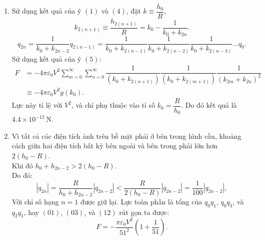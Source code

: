\begin{loigiai}
\begin{enumerate}
\begin{enumerate}[1) ]
        \item Sử dụng kết quả của ý $(1)$ và $(4)$, đặt $k\equiv\dfrac{h_0}{R}$,
        \[k_{2(n+1)}\equiv\dfrac{h_{2(n+1)}}{R}=k_0-\dfrac{1}{k_0+k_{2n}}.\]
        \[q_{2n}=\dfrac{1}{k_0+k_{2n-2}}q_{2(n-1)}=\dfrac{1}{k_0+k_{2(n-1)}}\dfrac{1}{k_0+k_{2(n-2)}}\dfrac{1}{k_0+k_{2(n-3)}}\dots q_0.\]
        Sử dụng kết quả của ý $(5)$:
        \begin{align*}
              F&=-4\pi\varepsilon_0V^2\sum_{m=0}^{\infty}\sum_{n=0}^{\infty}\dfrac{1}{(k_0+k_{2(n+1)})}\dfrac{1}{(k_0+k_{2(m+1)})}\dfrac{1}{(k_{2m}+k_{2n})^2}\\
              &\equiv-4\pi\varepsilon_0V^2g(k_0). 
        \end{align*}
      Lực này tỉ lệ với $V^2$, và chỉ phụ thuộc vào tỉ số $k_0=\dfrac{R}{h_0}$. Do đó kết quả là $4.4\times10^{-12}~\mathrm{N}$.
        \item Vì tất cả các điện tích ảnh trên bề mặt phải ở bên trong hình cầu, khoảng cách giữa hai điện tích bất kỳ bên ngoài và bên trong phải lớn hơn $2(h_0-R)$.\\
        Khi đó $h_0+h_{2n-2}>2(h_0-R)$.\\
        Do đó:
        \[\left|q_{2n}\right|=\dfrac{R}{h_0+h_{2n-2}}\left|q_{2n-2}\right|<\dfrac{R}{2(h_0-R)}\left|q_{2n-2}\right|=\dfrac{1}{100}\left|q_{2n-2}\right|,\]
        Với chỉ số hạng $n=1$ được giữ lại.
        Lực toàn phần là tổng của $q_0q_1$, $q_0q_3$, và $q_2q_1$, hay $(01)$, $(03)$, và $(12)$ rút gọn ta được:
        \[F=-\dfrac{\pi\varepsilon_0V^2}{51^2}\left(1+\dfrac{1}{51}\right).\]
        

\end{enumerate}
\end{enumerate}
\end{loigiai}
